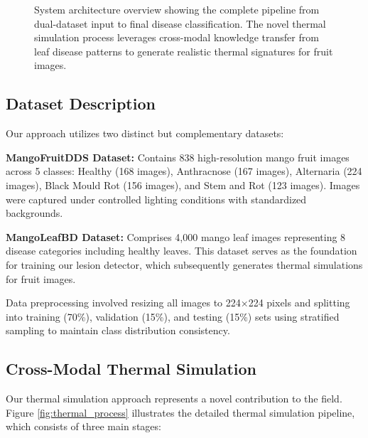 \documentclass[conference]{IEEEtran}
\begin{document}
\begin{figure}[htbp]
{
}
\caption{System architecture overview showing the complete pipeline from dual-dataset input to final disease classification. The novel thermal simulation process leverages cross-modal knowledge transfer from leaf disease patterns to generate realistic thermal signatures for fruit images.}
\label{fig:system_overview}
\end{figure}

\subsection{Dataset Description}

Our approach utilizes two distinct but complementary datasets:

\textbf{MangoFruitDDS Dataset:} Contains 838 high-resolution mango fruit images across 5 classes: Healthy (168 images), Anthracnose (167 images), Alternaria (224 images), Black Mould Rot (156 images), and Stem and Rot (123 images). Images were captured under controlled lighting conditions with standardized backgrounds.

\textbf{MangoLeafBD Dataset:} Comprises 4,000 mango leaf images representing 8 disease categories including healthy leaves. This dataset serves as the foundation for training our lesion detector, which subsequently generates thermal simulations for fruit images.

Data preprocessing involved resizing all images to 224×224 pixels and splitting into training (70\%), validation (15\%), and testing (15\%) sets using stratified sampling to maintain class distribution consistency.

\subsection{Cross-Modal Thermal Simulation}

Our thermal simulation approach represents a novel contribution to the field. Figure \ref{fig:thermal_process} illustrates the detailed thermal simulation pipeline, which consists of three main stages:
\end{document}
